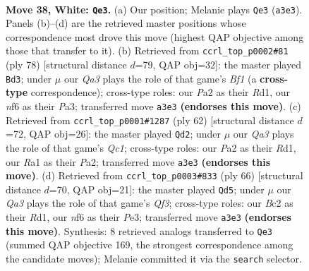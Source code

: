 \documentclass[11pt]{article}
\begin{document}
\clearpage

\begin{figure}[p]\centering
\begin{subfigure}{0.46\textwidth}\centering
\resizebox{\linewidth}{!}{%
\newchessgame
\chessboard[
  setfen={r1b4k/ppp2pp1/5n1p/8/3q4/Q4PbP/PPB3P1/R1B3K1 w - - 16 38},
  showmover=false,
  pgfstyle=straightmove, color=movearrow, markmove={a3-e3}
]}
\caption{}
\end{subfigure}\hfill
\begin{subfigure}{0.46\textwidth}\centering
\resizebox{\linewidth}{!}{%
\newchessgame
\chessboard[
  setfen={3r2k1/4p2p/qn2Pbp1/1pB5/p2P4/P5Q1/1P5P/3R1B1K w - - 2 40},
  showmover=false,
  pgfstyle=straightmove, color=movearrow, markmove={f1-d3}
]}
\caption{}
\end{subfigure}
\\[4pt]
\begin{subfigure}{0.46\textwidth}\centering
\resizebox{\linewidth}{!}{%
\newchessgame
\chessboard[
  setfen={6k1/2pbr2p/3p1qp1/pp1P4/5P2/5B1P/PP4PK/2QR4 w - - 7 32},
  showmover=false,
  pgfstyle=straightmove, color=movearrow, markmove={c1-d2}
]}
\caption{}
\end{subfigure}\hfill
\begin{subfigure}{0.46\textwidth}\centering
\resizebox{\linewidth}{!}{%
\newchessgame
\chessboard[
  setfen={2b2r1k/6p1/p4p1p/P3p3/npB5/1P2PQ1P/q4PP1/3R2K1 w - - 2 34},
  showmover=false,
  pgfstyle=straightmove, color=movearrow, markmove={f3-d5}
]}
\caption{}
\end{subfigure}
\caption{\textbf{Move 38, White: \texttt{Qe3}.} (a) Our position; Melanie plays \texttt{Qe3} (\texttt{a3e3}). Panels (b)--(d) are the retrieved master positions whose correspondence most drove this move (highest QAP objective among those that transfer to it). (b) Retrieved from \texttt{ccrl\_top\_p0002\#81} (ply 78) [structural distance $d$=79, QAP obj=32]: the master played \texttt{Bd3}; under $\mu$ our \emph{Qa3} plays the role of that game's \emph{Bf1} (a \textbf{cross-type} correspondence); cross-type roles: our \emph{P}a2 as their \emph{R}d1, our \emph{n}f6 as their \emph{P}a3; transferred move \texttt{a3e3} \textbf{(endorses this move)}. (c) Retrieved from \texttt{ccrl\_top\_p0001\#1287} (ply 62) [structural distance $d$=72, QAP obj=26]: the master played \texttt{Qd2}; under $\mu$ our \emph{Qa3} plays the role of that game's \emph{Qc1}; cross-type roles: our \emph{P}a2 as their \emph{R}d1, our \emph{R}a1 as their \emph{P}a2; transferred move \texttt{a3e3} \textbf{(endorses this move)}. (d) Retrieved from \texttt{ccrl\_top\_p0003\#833} (ply 66) [structural distance $d$=70, QAP obj=21]: the master played \texttt{Qd5}; under $\mu$ our \emph{Qa3} plays the role of that game's \emph{Qf3}; cross-type roles: our \emph{B}c2 as their \emph{R}d1, our \emph{n}f6 as their \emph{P}e3; transferred move \texttt{a3e3} \textbf{(endorses this move)}. Synthesis: 8 retrieved analogs transferred to \texttt{Qe3} (summed QAP objective 169, the strongest correspondence among the candidate moves); Melanie committed it via the \texttt{search} selector.}
\label{fig:thought-m74}
\end{figure}
\end{document}
